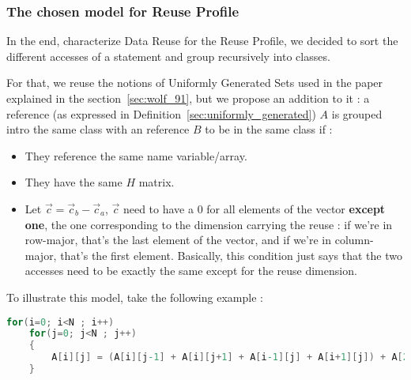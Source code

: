 \documentclass[paper=a4, fontsize=11.5pt]{scrartcl}
\numberwithin{equation}{section}        %
\numberwithin{figure}{section}          %
\numberwithin{table}{section}               %
\begin{document}

        \subsubsection{The chosen model for Reuse Profile}
            In the end, characterize Data Reuse for the Reuse Profile, we decided to
            sort the different accesses of a statement and group recursively into classes.

            For that, we reuse the notions of Uniformly Generated Sets used in the paper~\cite{Wolf'91}
            explained in the section~\ref{sec:wolf_91}, but we propose an addition to it :
            a reference (as expressed in Definition~\ref{sec:uniformly_generated}) $A$ is 
            grouped intro the same class with an reference $B$ to be in the same class if :
            \begin{itemize}
                \item They reference the same name variable/array.
                \item They have the same $H$ matrix.
                \item Let $\vec{c}=\vec{c}_b - \vec{c}_a$, $\vec{c}$ need to have a $0$
                    for all elements of the vector \textbf{except one}, the one corresponding
                    to the dimension carrying the reuse : if we're in row-major, that's the
                    last element of the vector, and if we're in column-major, that's the first
                    element. Basically, this condition just says that the two accesses need
                    to be exactly the same except for the reuse dimension.
            \end{itemize}

            \bigskip

            To illustrate this model, take the following example :

\begin{lstlisting}[frame=single, language=C, caption=Reuse Profiling example, label={lst:rp_example_0}]
for(i=0; i<N ; i++)
    for(j=0; j<N ; j++)
    {
        A[i][j] = (A[i][j-1] + A[i][j+1] + A[i-1][j] + A[i+1][j]) + A[2*i][j] + B[i][j]) / 6.0; //S1
    }
\end{lstlisting}
\end{document}
